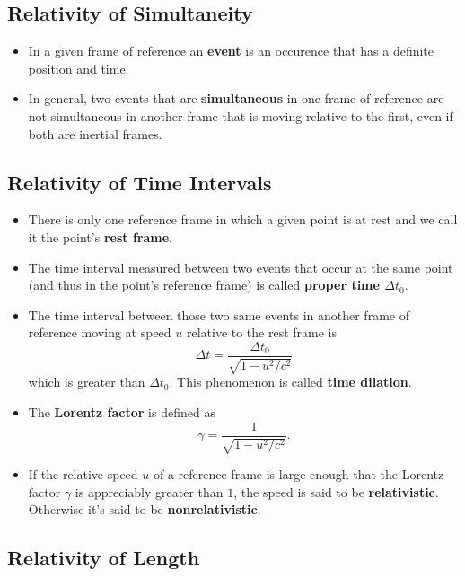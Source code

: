 \documentclass{article}
\begin{document}
\subsection{Relativity of Simultaneity}

\begin{itemize}
  \item In a given frame of reference an \textbf{event} is an occurence that has a definite position and time.

  \item In general, two events that are \textbf{simultaneous} in one frame of reference are not simultaneous in another frame that is moving relative to the first, even if both are inertial frames.
\end{itemize}

\subsection{Relativity of Time Intervals}

\begin{itemize}
  \item There is only one reference frame in which a given point is at rest and we call it the point's \textbf{rest frame}.

  \item The time interval measured between two events that occur at the same point (and thus in the point's reference frame) is called \textbf{proper time $\Delta t_0$}.

  \item The time interval between those two same events in another frame of reference moving at speed $u$ relative to the rest frame is \[\Delta t = \frac{\Delta t_0}{\sqrt{1 - u^2 / c^2}}\] which is greater than $\Delta t_0$. This phenomenon is called \textbf{time dilation}.

  \item The \textbf{Lorentz factor} is defined as \[\gamma = \frac{1}{\sqrt{1 - u^2 / c^2}}.\]

  \item If the relative speed $u$ of a reference frame is large enough that the Lorentz factor $\gamma$ is appreciably greater than $1$, the speed is said to be \textbf{relativistic}. Otherwise it's said to be \textbf{nonrelativistic}.
\end{itemize}

\subsection{Relativity of Length}
\end{document}
